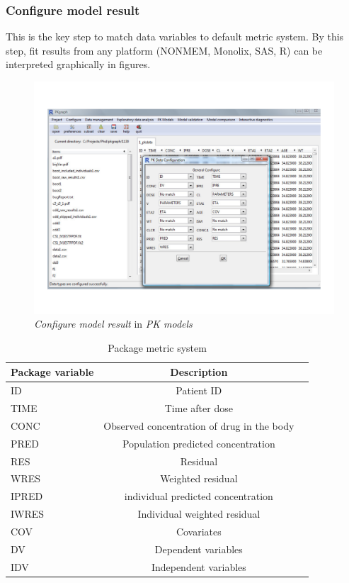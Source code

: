\documentclass[a4paper]{article}
\begin{document}
\subsubsection{Configure model result}
This is the key step to match data variables to default metric system. By this step, fit results from any platform (NONMEM, Monolix, SAS, R) can be interpreted graphically in figures.
\begin{figure}[h!tb] \centering
\includegraphics[scale=0.6]{pkmodel_config.pdf}
\caption{\textit{Configure model result} in \textit{PK models}}
\label{pkmodel_config}
\end{figure}
\begin{table}[h!tb] \centering
\begin{tabular}{lcc} \hline
\textbf{Package variable} & \textbf{Description}  \\ \hline
ID & Patient ID \\
TIME & Time after dose \\
CONC & Observed concentration of drug in the body \\
PRED & Population predicted concentration \\
RES & Residual \\
WRES & Weighted residual \\
IPRED & individual predicted concentration \\
IWRES & Individual weighted residual \\
COV & Covariates \\ 
DV & Dependent variables \\
IDV & Independent variables \\
\hline
\end{tabular}
\caption{Package metric system}
\label{c2_s3_t1}
\end{table}
\end{document}
